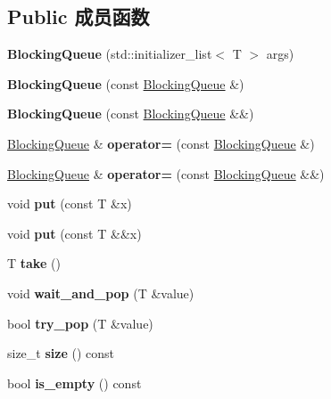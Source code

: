\subsection*{Public 成员函数}
\begin{DoxyCompactItemize}
\item 
\mbox{\label{classBlockingQueue_a4d1bbabd0a1212ab77b3a24614b6b0c1}} 
{\bfseries Blocking\+Queue} (std\+::initializer\+\_\+list$<$ T $>$ args)
\item 
\mbox{\label{classBlockingQueue_a2f2b1e4d887d77a81fddabd44c5cdbfd}} 
{\bfseries Blocking\+Queue} (const \hyperlink{classBlockingQueue}{Blocking\+Queue} \&)
\item 
\mbox{\label{classBlockingQueue_ab7dbc308989dda7bef2f884a2703c806}} 
{\bfseries Blocking\+Queue} (const \hyperlink{classBlockingQueue}{Blocking\+Queue} \&\&)
\item 
\mbox{\label{classBlockingQueue_aaee07bb9044a01b4cb0af75748795325}} 
\hyperlink{classBlockingQueue}{Blocking\+Queue} \& {\bfseries operator=} (const \hyperlink{classBlockingQueue}{Blocking\+Queue} \&)
\item 
\mbox{\label{classBlockingQueue_abbe4440d6ed06d175925bba1f3c02312}} 
\hyperlink{classBlockingQueue}{Blocking\+Queue} \& {\bfseries operator=} (const \hyperlink{classBlockingQueue}{Blocking\+Queue} \&\&)
\item 
\mbox{\label{classBlockingQueue_a1c824f8d644951d25bed9825794ddeae}} 
void {\bfseries put} (const T \&x)
\item 
\mbox{\label{classBlockingQueue_acedd6887a4af752440fb2dcd04292fa3}} 
void {\bfseries put} (const T \&\&x)
\item 
\mbox{\label{classBlockingQueue_aac788baea510940fc40961a285bacc5f}} 
T {\bfseries take} ()
\item 
\mbox{\label{classBlockingQueue_a8efc43c38666a38402c39f772da63fcf}} 
void {\bfseries wait\+\_\+and\+\_\+pop} (T \&value)
\item 
\mbox{\label{classBlockingQueue_a47a2d7726112b4e2d7b3f65a4e84aa06}} 
bool {\bfseries try\+\_\+pop} (T \&value)
\item 
\mbox{\label{classBlockingQueue_a733361d5721c6ba64af3e129921c43b0}} 
size\+\_\+t {\bfseries size} () const
\item 
\mbox{\label{classBlockingQueue_a06f9211f5225bb6413f403e8d14ca7ce}} 
bool {\bfseries is\+\_\+empty} () const
\end{DoxyCompactItemize}


